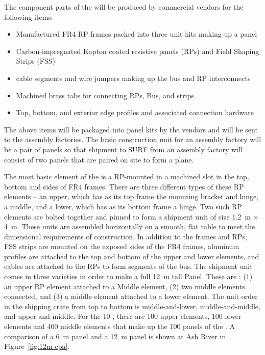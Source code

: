 The component parts of the  %
will be produced by commercial vendors for the following items:
\begin{itemize}
\item Manufactured FR4 RP frames packed into three  unit kits making up a  panel
\item Carbon-impregnated Kapton coated resistive panels (RPs) and Field Shaping Strips (FSS)
\item {} cable segments and wire jumpers making up the   bus and RP interconnects
\item Machined brass tabs for connecting RPs,  Bus, and strips %
\item Top, bottom, and exterior edge profiles and associated connection hardware
\end{itemize}
The above items will be packaged into  panel kits by the vendors and will be sent to the assembly factories.  The basic construction unit for an assembly factory will be a pair of  panels so that shipment to SURF from an assembly factory will consist of two  panels that are paired on site to form a  plane.

The most basic element of the  is a RP-mounted in a machined slot in the top, bottom and sides of FR4 frames.  There are three different types of these  RP elements -- an upper, which has as its top frame the  mounting bracket and  hinge, a middle, and a lower, which has as its bottom frame a  hinge.  Two such  RP elements are bolted together and pinned to form a shipment  unit of size \SI{1.2}{\m} $\times$ \SI{4}{\m}.  These  units are assembled horizontally on a smooth, flat table to meet the dimensional requirements of  construction.  In addition to the frames and RPs, %
FSS strips are mounted on the exposed sides of the FR4 frames, aluminum profiles are attached to the top and bottom of the upper and lower elements, and cables are attached to the RPs to form segments of the  bus.  The shipment  unit comes in three varieties in order to make a full \SI{12}{\m} tall  Panel.  These are : (1) an upper  RP element attached to a Middle element, (2) two middle elements connected, and (3) a middle element attached to a lower element.  The  unit order in the shipping crate from top to bottom is middle-and-lower, middle-and-middle, and upper-and-middle.  For the \SI{10}{\kt} , there are 100 upper elements, 100 lower elements and 400 middle elements that make up the 100  panels of the .
A comparison of a \SI{6}{\m}   panel and a \SI{12}{\m}  panel is shown at Ash River in Figure~\ref{fig:12m-cpa}.

